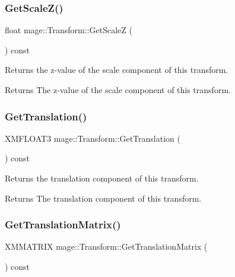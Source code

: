 \subsubsection{\texorpdfstring{Get\+Scale\+Z()}{GetScaleZ()}}
{\footnotesize\ttfamily float mage\+::\+Transform\+::\+Get\+ScaleZ (\begin{DoxyParamCaption}{ }\end{DoxyParamCaption}) const}

Returns the z-\/value of the scale component of this transform.

\begin{DoxyReturn}{Returns}
The z-\/value of the scale component of this transform. 
\end{DoxyReturn}
\hypertarget{structmage_1_1_transform_aca74308060f244adf137676e79a9f6e5}{}\label{structmage_1_1_transform_aca74308060f244adf137676e79a9f6e5} 
\subsubsection{\texorpdfstring{Get\+Translation()}{GetTranslation()}}
{\footnotesize\ttfamily X\+M\+F\+L\+O\+A\+T3 mage\+::\+Transform\+::\+Get\+Translation (\begin{DoxyParamCaption}{ }\end{DoxyParamCaption}) const}

Returns the translation component of this transform.

\begin{DoxyReturn}{Returns}
The translation component of this transform. 
\end{DoxyReturn}
\hypertarget{structmage_1_1_transform_a4f246a50de8bdfd1bd9dd8e07b7a8c01}{}\label{structmage_1_1_transform_a4f246a50de8bdfd1bd9dd8e07b7a8c01} 
\subsubsection{\texorpdfstring{Get\+Translation\+Matrix()}{GetTranslationMatrix()}}
{\footnotesize\ttfamily X\+M\+M\+A\+T\+R\+IX mage\+::\+Transform\+::\+Get\+Translation\+Matrix (\begin{DoxyParamCaption}{ }\end{DoxyParamCaption}) const}

